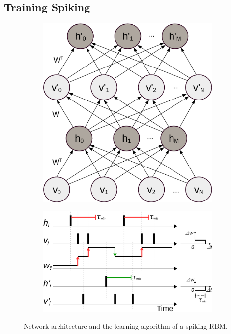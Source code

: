 \DIFdelbegin %
\DIFdelend \DIFaddbegin \subsection[Spiking RBMs]{\DIFaddend Training Spiking \DIFdelbegin {}\DIFdelend \DIFaddbegin {}\DIFaddend }
\label{subsec:exp_SRBM}
\begin{figure}[h]
	\centering
		\begin{subfigure}[c]{0.33\textwidth}
			\includegraphics[width=\textwidth]{pics_sdlm/rbm.png}
		\end{subfigure}
		\begin{subfigure}[c]{0.66\textwidth}
			\includegraphics[width=\textwidth]{pics_sdlm/rSTDP_rbm.png}
		\end{subfigure}
	\caption{Network architecture and the learning algorithm of a spiking RBM.}
	\label{fig:sRBM}
\end{figure}

